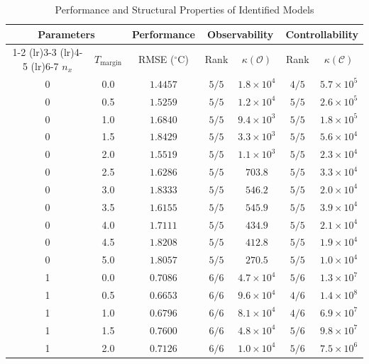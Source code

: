 
\begin{table}[ht]
    \centering
    \caption{Performance and Structural Properties of Identified Models}
    \label{tab:model_analysis}
    \begin{tabular}{cc c cc cc}
        \toprule
        \multicolumn{2}{c}{Parameters} & \multicolumn{1}{c}{Performance} & \multicolumn{2}{c}{Observability} & \multicolumn{2}{c}{Controllability} \\
        \cmidrule(lr){1-2} \cmidrule(lr){3-3} \cmidrule(lr){4-5} \cmidrule(lr){6-7}
        $n_x$ & $T_{\text{margin}}$ & RMSE ($^\circ$C) & Rank & $\kappa(\mathcal{O})$ & Rank & $\kappa(\mathcal{C})$ \\
        \midrule
0 & 0.0 & $1.4457$ & $5/5$ & $1.8 \times 10^{4}$ & $4/5$ & $5.7 \times 10^{5}$ \\
        0 & 0.5 & $1.5259$ & $5/5$ & $1.2 \times 10^{4}$ & $5/5$ & $2.6 \times 10^{5}$ \\
        0 & 1.0 & $1.6840$ & $5/5$ & $9.4 \times 10^{3}$ & $5/5$ & $1.8 \times 10^{5}$ \\
        0 & 1.5 & $1.8429$ & $5/5$ & $3.3 \times 10^{3}$ & $5/5$ & $5.6 \times 10^{4}$ \\
        0 & 2.0 & $1.5519$ & $5/5$ & $1.1 \times 10^{3}$ & $5/5$ & $2.3 \times 10^{4}$ \\
        0 & 2.5 & $1.6286$ & $5/5$ & $703.8$ & $5/5$ & $3.3 \times 10^{4}$ \\
        0 & 3.0 & $1.8333$ & $5/5$ & $546.2$ & $5/5$ & $2.0 \times 10^{4}$ \\
        0 & 3.5 & $1.6155$ & $5/5$ & $545.9$ & $5/5$ & $3.9 \times 10^{4}$ \\
        0 & 4.0 & $1.7111$ & $5/5$ & $434.9$ & $5/5$ & $2.1 \times 10^{4}$ \\
        0 & 4.5 & $1.8208$ & $5/5$ & $412.8$ & $5/5$ & $1.9 \times 10^{4}$ \\
        0 & 5.0 & $1.8057$ & $5/5$ & $270.5$ & $5/5$ & $1.0 \times 10^{4}$ \\
        1 & 0.0 & $0.7086$ & $6/6$ & $4.7 \times 10^{4}$ & $5/6$ & $1.3 \times 10^{7}$ \\
        1 & 0.5 & $0.6653$ & $6/6$ & $9.6 \times 10^{4}$ & $4/6$ & $1.4 \times 10^{8}$ \\
        1 & 1.0 & $0.6796$ & $6/6$ & $8.1 \times 10^{4}$ & $4/6$ & $6.9 \times 10^{7}$ \\
        1 & 1.5 & $0.7600$ & $6/6$ & $4.8 \times 10^{4}$ & $5/6$ & $9.8 \times 10^{7}$ \\
        1 & 2.0 & $0.7126$ & $6/6$ & $1.0 \times 10^{4}$ & $5/6$ & $7.5 \times 10^{6}$ \\

\end{tabular}
\end{table}
